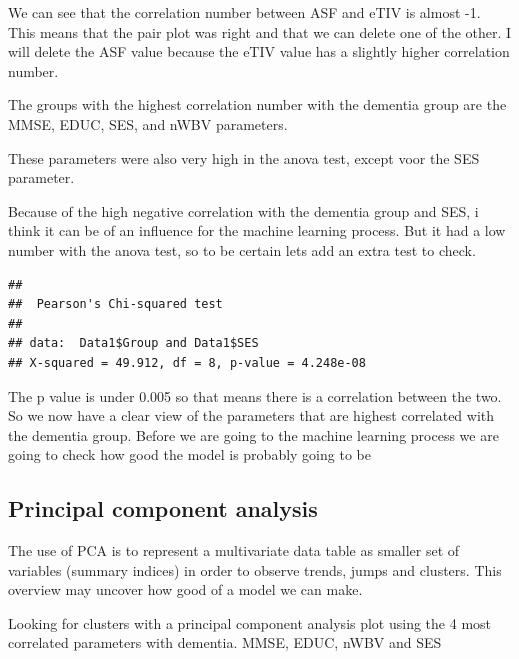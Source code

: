 \documentclass[
]{article}
\newenvironment{Shaded}{\begin{snugshade}}{\end{snugshade}}
\newcommand{\FunctionTok}[1]{\textcolor[rgb]{0.00,0.00,0.00}{#1}}
\newcommand{\NormalTok}[1]{#1}
\newcommand{\SpecialCharTok}[1]{\textcolor[rgb]{0.00,0.00,0.00}{#1}}
\begin{document}
We can see that the correlation number between ASF and eTIV is almost
-1. This means that the pair plot was right and that we can delete one
of the other. I will delete the ASF value because the eTIV value has a
slightly higher correlation number.

The groups with the highest correlation number with the dementia group
are the MMSE, EDUC, SES, and nWBV parameters.

These parameters were also very high in the anova test, except voor the
SES parameter.

Because of the high negative correlation with the dementia group and
SES, i think it can be of an influence for the machine learning process.
But it had a low number with the anova test, so to be certain lets add
an extra test to check.

\begin{Shaded}
\end{Shaded}

\begin{verbatim}
## 
##  Pearson's Chi-squared test
## 
## data:  Data1$Group and Data1$SES
## X-squared = 49.912, df = 8, p-value = 4.248e-08
\end{verbatim}

The p value is under 0.005 so that means there is a correlation between
the two. So we now have a clear view of the parameters that are highest
correlated with the dementia group. Before we are going to the machine
learning process we are going to check how good the model is probably
going to be

\hypertarget{principal-component-analysis}{%
\subsection{Principal component
analysis}\label{principal-component-analysis}}

The use of PCA is to represent a multivariate data table as smaller set
of variables (summary indices) in order to observe trends, jumps and
clusters. This overview may uncover how good of a model we can make.

Looking for clusters with a principal component analysis plot using the
4 most correlated parameters with dementia. MMSE, EDUC, nWBV and SES
\end{document}
